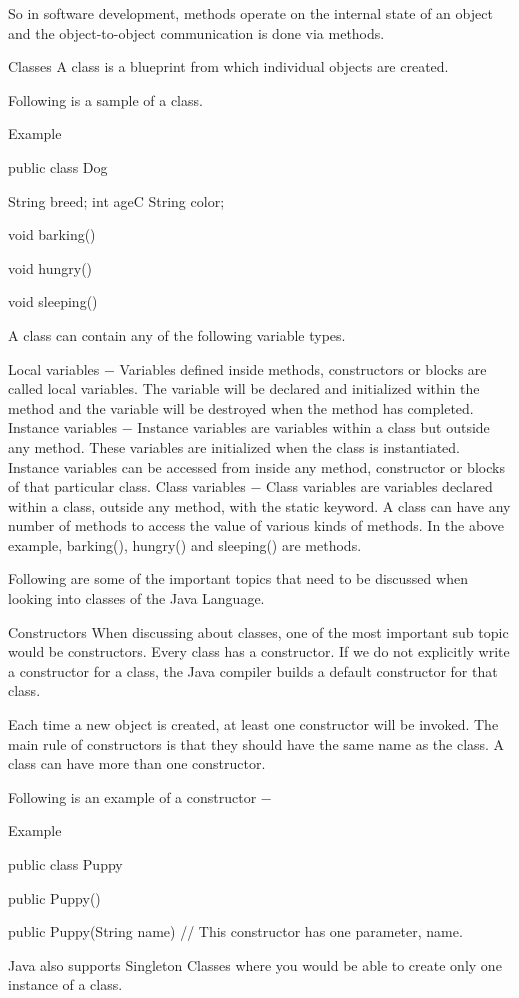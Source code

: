 So in software development, methods operate on the internal state of an object and the object-to-object communication is done via methods.

Classes
A class is a blueprint from which individual objects are created.

Following is a sample of a class.

Example

public class Dog {
   String breed;
   int ageC
   String color;

   void barking() {
   }

   void hungry() {
   }

   void sleeping() {
   }
}
A class can contain any of the following variable types.

Local variables − Variables defined inside methods, constructors or blocks are called local variables. The variable will be declared and initialized within the method and the variable will be destroyed when the method has completed.
Instance variables − Instance variables are variables within a class but outside any method. These variables are initialized when the class is instantiated. Instance variables can be accessed from inside any method, constructor or blocks of that particular class.
Class variables − Class variables are variables declared within a class, outside any method, with the static keyword.
A class can have any number of methods to access the value of various kinds of methods. In the above example, barking(), hungry() and sleeping() are methods.

Following are some of the important topics that need to be discussed when looking into classes of the Java Language.

Constructors
When discussing about classes, one of the most important sub topic would be constructors. Every class has a constructor. If we do not explicitly write a constructor for a class, the Java compiler builds a default constructor for that class.

Each time a new object is created, at least one constructor will be invoked. The main rule of constructors is that they should have the same name as the class. A class can have more than one constructor.

Following is an example of a constructor −

Example

public class Puppy {
   public Puppy() {
   }

   public Puppy(String name) {
      // This constructor has one parameter, name.
   }
}
Java also supports Singleton Classes where you would be able to create only one instance of a class.

